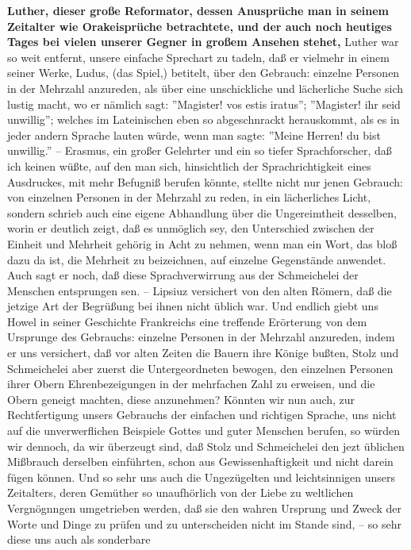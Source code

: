 \textbf{Luther, dieser große Reformator, dessen Anusprüche man in seinem Zeitalter
wie Orakeisprüche betrachtete, und der auch noch heutiges Tages bei vielen
unserer Gegner in großem Ansehen stehet,} Luther war so weit entfernt, unsere
einfache Sprechart zu tadeln, daß er vielmehr in einem seiner Werke, Ludus, (das
Spiel,) betitelt, über den Gebrauch: einzelne Personen in der Mehrzahl
anzureden, als über eine unschickliche und lächerliche Suche sich lustig macht,
wo er nämlich sagt: ''Magister! vos estis iratus''; ''Magister! ihr seid
unwillig''; welches im Lateinischen eben so abgeschnrackt herauskommt, als es in
jeder andern Sprache lauten würde, wenn man sagte: ''Meine Herren! du bist
unwillig.'' -- Erasmus, ein großer Gelehrter und ein so tiefer Sprachforscher,
daß ich keinen wüßte, auf den man sich, hinsichtlich der Sprachrichtigkeit eines
Ausdruckes, mit mehr Befugniß berufen könnte, stellte nicht nur jenen Gebrauch:
von einzelnen Personen in der Mehrzahl zu reden, in ein lächerliches Licht,
sondern schrieb auch eine eigene Abhandlung über die Ungereimtheit desselben,
worin er deutlich zeigt, daß es unmöglich sey, den Unterschied zwischen der
Einheit und Mehrheit gehörig in Acht zu nehmen, wenn man ein Wort, das bloß dazu
da ist, die Mehrheit zu beizeichnen, auf einzelne Gegenstände anwendet. Auch
sagt er noch, daß diese Sprachverwirrung aus der Schmeichelei der Menschen
entsprungen sen. -- Lipsiuz versichert von den alten Römern, daß die jetzige Art
der Begrüßung bei ihnen nicht üblich war. Und endlich giebt uns Howel in seiner
Geschichte Frankreichs eine treffende Erörterung von dem Ursprunge des
Gebrauchs: einzelne Personen in der Mehrzahl anzureden, indem er uns versichert,
daß vor alten Zeiten die Bauern ihre Könige bußten, Stolz und Schmeichelei aber
zuerst die Untergeordneten bewogen, den einzelnen Personen ihrer Obern
Ehrenbezeigungen in der mehrfachen Zahl zu erweisen, und die Obern geneigt
machten, diese anzunehmen? Könnten wir nun auch, zur Rechtfertigung unsers
Gebrauchs der einfachen und richtigen Sprache, uns nicht auf die unverwerflichen
Beispiele Gottes und guter Menschen berufen, so würden wir dennoch, da wir
überzeugt sind, daß Stolz und Schmeichelei den jezt üblichen Mißbrauch derselben
einführten, schon aus Gewissenhaftigkeit und nicht darein fügen können. Und so
sehr uns auch die Ungezügelten und leichtsinnigen unsers Zeitalters, deren
Gemüther so unaufhörlich von der Liebe zu weltlichen Vergnögnngen umgetrieben
werden, daß sie den wahren Ursprung und Zweck der Worte und Dinge zu prüfen und
zu unterscheiden nicht im Stande sind, -- so sehr diese uns auch als sonderbare
